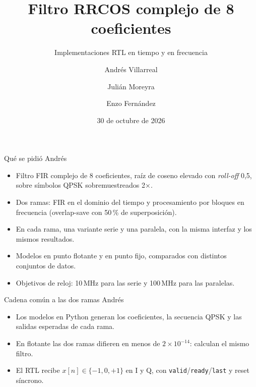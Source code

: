 \documentclass[aspectratio=169,11pt]{beamer}
\title{Filtro RRCOS complejo de 8 coeficientes}
\subtitle{Implementaciones RTL en tiempo y en frecuencia}
\author{Andrés Villarreal \and Julián Moreyra \and Enzo Fernández}
\date{30 de octubre de 2026}
\newcommand{\presenta}[1]{\hfill{\normalfont\small\color{gray}#1}}
\begin{document}
\begin{frame}
  \titlepage
\end{frame}

\begin{frame}{Qué se pidió \presenta{Andrés}}
  \begin{itemize}
    \item Filtro FIR complejo de 8 coeficientes, raíz de coseno elevado con \emph{roll-off} 0,5, sobre símbolos QPSK sobremuestreados 2×.
    \item Dos ramas: FIR en el dominio del tiempo y procesamiento por bloques en frecuencia (overlap-save con 50\,\% de superposición).
    \item En cada rama, una variante serie y una paralela, con la misma interfaz y los mismos resultados.
    \item Modelos en punto flotante y en punto fijo, comparados con distintos conjuntos de datos.
    \item Objetivos de reloj: 10\,MHz para las serie y 100\,MHz para las paralelas.
  \end{itemize}
\end{frame}

\begin{frame}{Cadena común a las dos ramas \presenta{Andrés}}
  \centering
  

  \bigskip
  \begin{itemize}
    \item Los modelos en Python generan los coeficientes, la secuencia QPSK y las salidas esperadas de cada rama.
    \item En flotante las dos ramas difieren en menos de $2\times10^{-14}$: calculan el mismo filtro.
    \item El RTL recibe $x[n] \in \{-1, 0, +1\}$ en I y Q, con \texttt{valid}/\texttt{ready}/\texttt{last} y reset síncrono.
  \end{itemize}
\end{frame}
\end{document}
